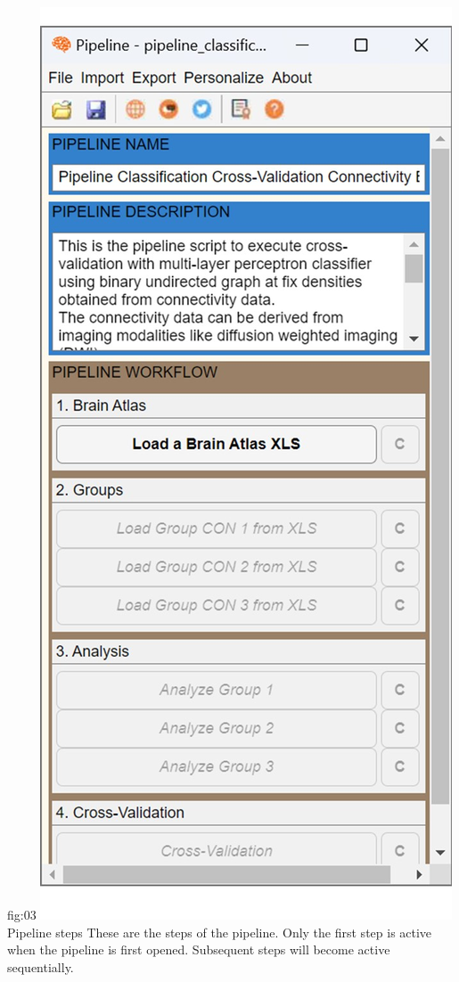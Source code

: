 \documentclass[justified]{tufte-handout}
\begin{document}
{
	{fig:03}
	{
	\includegraphics{fig03.jpg}
	}
	{Pipeline steps}
	{
	These are the steps of the pipeline. Only the first step is active when the pipeline is first opened. Subsequent steps will become active sequentially.
	}

}
\end{document}
